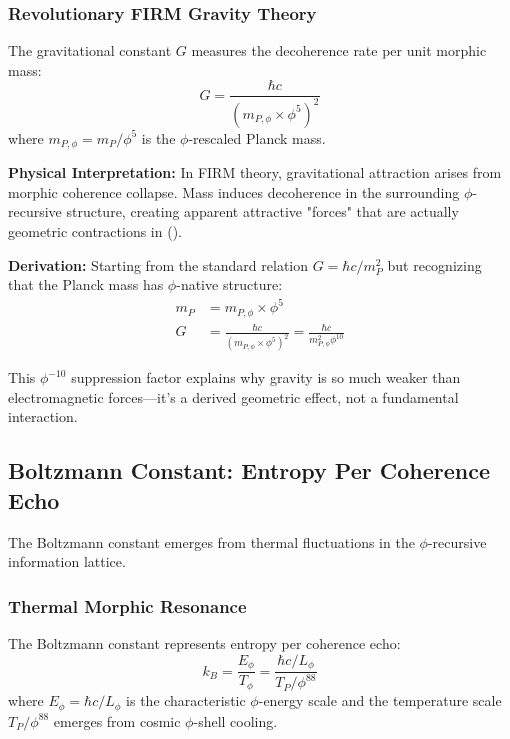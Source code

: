 \subsubsection{Revolutionary FIRM Gravity Theory}

\begin{theorem}
The gravitational constant $G$ measures the decoherence rate per unit morphic mass:
\begin{equation}
G = \frac{\hbar c}{(m_{P,\phi} \times \phi^5)^2}
\end{equation}
where $m_{P,\phi} = m_P/\phi^5$ is the $\phi$-rescaled Planck mass.
\end{theorem}

\textbf{Physical Interpretation:}
In FIRM theory, gravitational attraction arises from morphic coherence collapse. Mass induces decoherence in the surrounding $\phi$-recursive structure, creating apparent attractive "forces" that are actually geometric contractions in ().

\textbf{Derivation:}
Starting from the standard relation $G = \hbar c/m_P^2$ but recognizing that the Planck mass has $\phi$-native structure:
\begin{align}
m_P &= m_{P,\phi} \times \phi^5\\
G &= \frac{\hbar c}{(m_{P,\phi} \times \phi^5)^2} = \frac{\hbar c}{m_{P,\phi}^2 \phi^{10}}
\end{align}

This $\phi^{-10}$ suppression factor explains why gravity is so much weaker than electromagnetic forces—it's a derived geometric effect, not a fundamental interaction.

\subsection{Boltzmann Constant: Entropy Per Coherence Echo}

The Boltzmann constant emerges from thermal fluctuations in the $\phi$-recursive information lattice.

\subsubsection{Thermal Morphic Resonance}

\begin{theorem}
The Boltzmann constant represents entropy per coherence echo:
\begin{equation}
k_B = \frac{E_\phi}{T_\phi} = \frac{\hbar c/L_\phi}{T_P/\phi^{88}}
\end{equation}
where $E_\phi = \hbar c/L_\phi$ is the characteristic $\phi$-energy scale and the temperature scale $T_P/\phi^{88}$ emerges from cosmic $\phi$-shell cooling.
\end{theorem}

